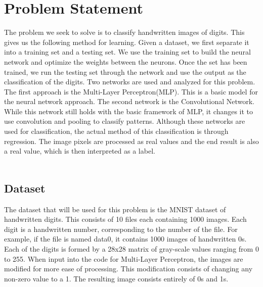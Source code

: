 \documentclass[12pt,twoside]{article} %
\begin{document}
\section{Problem Statement}
The problem we seek to solve is to classify handwritten images of digits. This gives us the following method for learning. Given a dataset, we first separate it into a training set and a testing set. We use the training set to build the neural network and optimize the weights between the neurons. Once the set has been trained, we run the testing set through the network and use the output as the classification of the digits. Two networks are used and analyzed for this problem. The first approach is the Multi-Layer Perceptron(MLP). This is a basic model for the neural network approach. The second network is the Convolutional Network. While this network still holds with the basic framework of MLP, it changes it to use convolution and pooling to classify patterns. Although these networks are used for classification, the actual method of this classification is through regression. The image pixels are processed as real values and the end result is also a real value, which is then interpreted as a label.
\\\\
\subsection{Dataset}
The dataset that will be used for this problem is the MNIST dataset of handwritten digits. This consists of 10 files each containing 1000 images. Each digit is a handwritten number, corresponding to the number of the file. For example, if the file is named data0, it contains 1000 images of handwritten 0s. Each of the digits is formed by a 28x28 matrix of gray-scale values ranging from 0 to 255. When input into the code for Multi-Layer Perceptron, the images are modified for more ease of processing. This modification consists of changing any non-zero value to a 1. The resulting image consists entirely of 0s and 1s.  
\\\\
\end{document}
